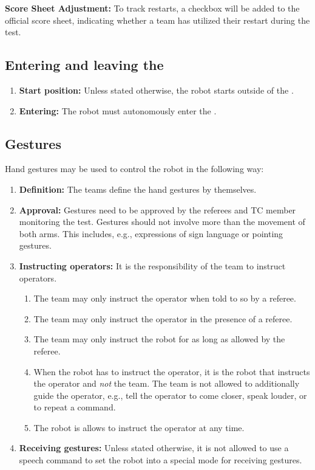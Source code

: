 \textbf{Score Sheet Adjustment:} 
To track restarts, a checkbox will be added to the official score sheet, indicating whether a team has utilized their restart during the test.


\subsection{Entering and leaving the \Arena{}}
\label{rule:start_position}
\begin{enumerate}

	\item \textbf{Start position:} Unless stated otherwise, the robot starts outside of the \Arena{}.
	\item \textbf{Entering:} The robot must autonomously enter the \Arena{}.
\end{enumerate}



\subsection{Gestures}
\label{rule:gestures}
Hand gestures may be used to control the robot in the following way:
\begin{enumerate}
	\item \textbf{Definition:} The teams define the hand gestures by themselves.

	\item \textbf{Approval:} Gestures need to be approved by the referees and TC member monitoring the test. Gestures should not involve more than the movement of both arms. This includes, e.g., expressions of sign language or pointing gestures.

	\item \textbf{Instructing operators:} It is the responsibility of the team to instruct operators.
	\begin{enumerate}
		\item The team may only instruct the operator when told to so by a referee.
		\item The team may only instruct the operator in the presence of a referee.
		\item The team may only instruct the robot for as long as allowed by the referee.
		\item When the robot has to instruct the operator, it is the robot that instructs the operator and \emph{not} the team. The team is not allowed to additionally guide the operator, e.g., tell the operator to come closer, speak louder, or to repeat a command.
		\item The robot is allows to instruct the operator at any time.
	\end{enumerate}

	\item \textbf{Receiving gestures:} Unless stated otherwise, it is not allowed to use a speech command to set the robot into a special mode for receiving gestures.
\end{enumerate}



